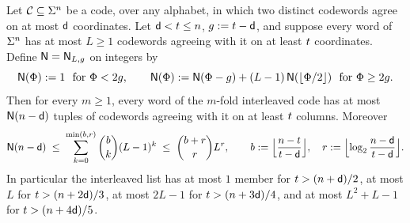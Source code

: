 \begin{theorem}\label{thm:I}
Let $\mathcal C\subseteq\Sigma^n$ be a code, over any alphabet, in which two distinct codewords agree on at most $\mathsf{d}$ coordinates. Let $\mathsf{d}<t\le n$, $g:=t-\mathsf{d}$, and suppose every word of $\Sigma^n$ has at most $L\ge1$ codewords agreeing with it on at least $t$ coordinates. Define $\mathsf{N}=\mathsf{N}_{L,g}$ on integers by
\[
\mathsf{N}(\Phi):=1\ \text{ for }\Phi<2g,\qquad \mathsf{N}(\Phi):=\mathsf{N}(\Phi-g)+(L-1)\,\mathsf{N}(\lfloor\Phi/2\rfloor)\ \text{ for }\Phi\ge2g.
\]
Then for every $m\ge1$, every word of the $m$-fold interleaved code has at most $\mathsf{N}(n-\mathsf{d})$ tuples of codewords agreeing with it on at least $t$ columns. Moreover
\[
\mathsf{N}(n-\mathsf{d})\;\le\;\sum_{k=0}^{\min(b,r)}\binom bk(L-1)^k\;\le\;\binom{b+r}{r}L^r,\qquad b:=\Bigl\lfloor\frac{n-t}{t-\mathsf{d}}\Bigr\rfloor,\quad r:=\Bigl\lfloor\log_2\frac{n-\mathsf{d}}{t-\mathsf{d}}\Bigr\rfloor.
\]
In particular the interleaved list has at most $1$ member for $t>(n+\mathsf{d})/2$, at most $L$ for $t>(n+2\mathsf{d})/3$, at most $2L-1$ for $t>(n+3\mathsf{d})/4$, and at most $L^2+L-1$ for $t>(n+4\mathsf{d})/5$.
\end{theorem}
